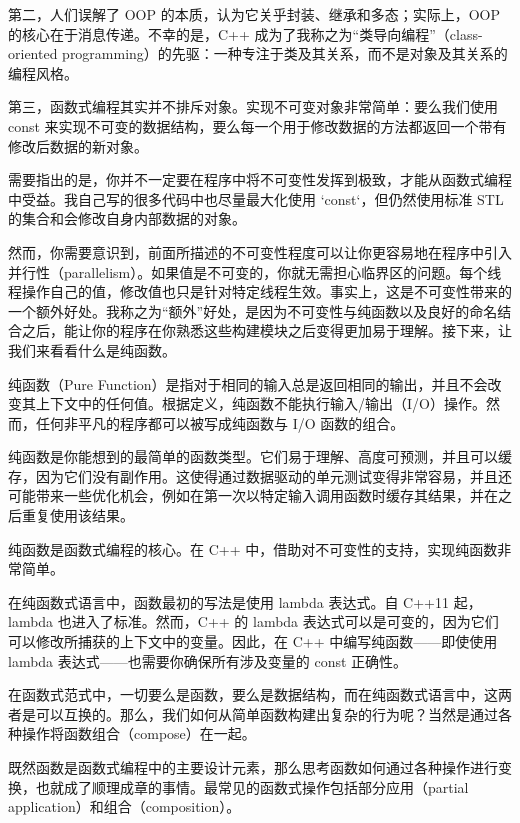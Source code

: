 第二，人们误解了 OOP 的本质，认为它关乎封装、继承和多态；实际上，OOP 的核心在于消息传递。不幸的是，C++ 成为了我称之为“类导向编程”（class-oriented programming）的先驱：一种专注于类及其关系，而不是对象及其关系的编程风格。

第三，函数式编程其实并不排斥对象。实现不可变对象非常简单：要么我们使用 const 来实现不可变的数据结构，要么每一个用于修改数据的方法都返回一个带有修改后数据的新对象。

需要指出的是，你并不一定要在程序中将不可变性发挥到极致，才能从函数式编程中受益。我自己写的很多代码中也尽量最大化使用 `const`，但仍然使用标准 STL 的集合和会修改自身内部数据的对象。

然而，你需要意识到，前面所描述的不可变性程度可以让你更容易地在程序中引入并行性（parallelism）。如果值是不可变的，你就无需担心临界区的问题。每个线程操作自己的值，修改值也只是针对特定线程生效。事实上，这是不可变性带来的一个额外好处。我称之为“额外”好处，是因为不可变性与纯函数以及良好的命名结合之后，能让你的程序在你熟悉这些构建模块之后变得更加易于理解。接下来，让我们来看看什么是纯函数。


纯函数（Pure Function）是指对于相同的输入总是返回相同的输出，并且不会改变其上下文中的任何值。根据定义，纯函数不能执行输入/输出（I/O）操作。然而，任何非平凡的程序都可以被写成纯函数与 I/O 函数的组合。

纯函数是你能想到的最简单的函数类型。它们易于理解、高度可预测，并且可以缓存，因为它们没有副作用。这使得通过数据驱动的单元测试变得非常容易，并且还可能带来一些优化机会，例如在第一次以特定输入调用函数时缓存其结果，并在之后重复使用该结果。

纯函数是函数式编程的核心。在 C++ 中，借助对不可变性的支持，实现纯函数非常简单。

在纯函数式语言中，函数最初的写法是使用 lambda 表达式。自 C++11 起，lambda 也进入了标准。然而，C++ 的 lambda 表达式可以是可变的，因为它们可以修改所捕获的上下文中的变量。因此，在 C++ 中编写纯函数——即使使用 lambda 表达式——也需要你确保所有涉及变量的 const 正确性。

在函数式范式中，一切要么是函数，要么是数据结构，而在纯函数式语言中，这两者是可以互换的。那么，我们如何从简单函数构建出复杂的行为呢？当然是通过各种操作将函数组合（compose）在一起。



既然函数是函数式编程中的主要设计元素，那么思考函数如何通过各种操作进行变换，也就成了顺理成章的事情。最常见的函数式操作包括部分应用（partial application）和组合（composition）。

